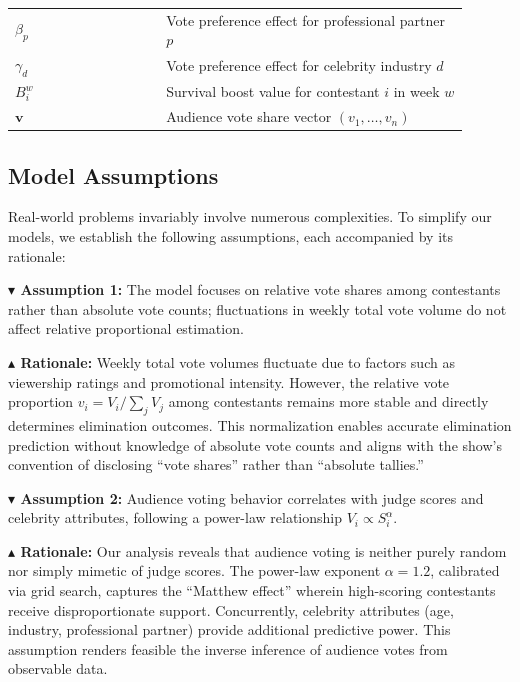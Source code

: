 \begin{table}[ht]
\begin{tabular}{>{\centering\arraybackslash}p{0.3\linewidth} >{\centering\arraybackslash}p{0.6\linewidth}}
$\beta_p$ & Vote preference effect for professional partner $p$ \\

$\gamma_d$ & Vote preference effect for celebrity industry $d$ \\

$B_i^w$ & Survival boost value for contestant $i$ in week $w$ \\

$\mathbf{v}$ & Audience vote share vector $(v_1, \ldots, v_n)$ \\


\bottomrule %
\end{tabular}
\label{table:notations}
\end{table}
\subsection{Model Assumptions}

Real-world problems invariably involve numerous complexities. To simplify our models, we establish the following assumptions, each accompanied by its rationale:

\noindent\textbf{$\blacktriangledown$ Assumption 1:} The model focuses on relative vote shares among contestants rather than absolute vote counts; fluctuations in weekly total vote volume do not affect relative proportional estimation.

\noindent\textbf{$\blacktriangle$ Rationale:} Weekly total vote volumes fluctuate due to factors such as viewership ratings and promotional intensity. However, the relative vote proportion $v_i = V_i / \sum_j V_j$ among contestants remains more stable and directly determines elimination outcomes. This normalization enables accurate elimination prediction without knowledge of absolute vote counts and aligns with the show's convention of disclosing ``vote shares'' rather than ``absolute tallies.''

\vspace{0.3em}

\noindent\textbf{$\blacktriangledown$ Assumption 2:} Audience voting behavior correlates with judge scores and celebrity attributes, following a power-law relationship $V_i \propto S_i^\alpha$.

\noindent\textbf{$\blacktriangle$ Rationale:} Our analysis reveals that audience voting is neither purely random nor simply mimetic of judge scores. The power-law exponent $\alpha = 1.2$, calibrated via grid search, captures the ``Matthew effect'' wherein high-scoring contestants receive disproportionate support. Concurrently, celebrity attributes (age, industry, professional partner) provide additional predictive power. This assumption renders feasible the inverse inference of audience votes from observable data.

